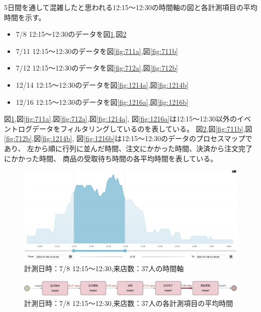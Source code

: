 \documentclass{jsarticle}
\begin{document}
5日間を通して混雑したと思われる12:15〜12:30の時間軸の図と各計測項目の平均時間を示す。
\begin{itemize}
\item 7/8 12:15〜12:30のデータを図\ref{fig:708a},図\ref{fig:708b}
\item 7/11 12:15〜12:30のデータを図\ref{fig:711a},図\ref{fig:711b}
\item 7/12 12:15〜12:30のデータを図\ref{fig:712a},図\ref{fig:712b}
\item 12/14 12:15〜12:30のデータを図\ref{fig:1214a},図\ref{fig:1214b}
\item 12/16 12:15〜12:30のデータを図\ref{fig:1216a},図\ref{fig:1216b}
\end{itemize}

図\ref{fig:708a},図\ref{fig:711a},図\ref{fig:712a},図\ref{fig:1214a},
図\ref{fig:1216a}は12:15〜12:30以外のイベントログデータをフィルタリングしているのを表している。
図\ref{fig:708b},図\ref{fig:711b},図\ref{fig:712b},図\ref{fig:1214b},
図\ref{fig:1216b}は12:15〜12:30のデータのプロセスマップであり、
左から順に行列に並んだ時間、注文にかかった時間、決済から注文完了にかかった時間、
商品の受取待ち時間の各平均時間を表している。

\begin{figure}[H]
  \centering
  \includegraphics[width=14cm]{708a.png}
  \caption{計測日時：7/8 12:15〜12:30,来店数：37人の時間軸}
  \label{fig:708a}
\end{figure}

\begin{figure}[H]
  \centering
  \includegraphics[width=15cm]{708b.png}
  \caption{計測日時：7/8 12:15〜12:30,来店数：37人の各計測項目の平均時間}
  \label{fig:708b}
\end{figure}
\end{document}
